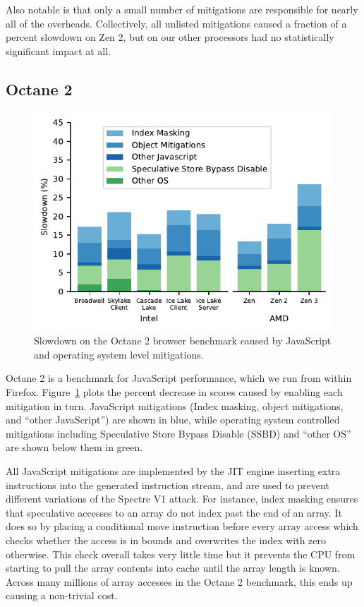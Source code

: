 Also notable is that only a small number of mitigations are responsible for nearly all of the overheads.
Collectively, all unlisted mitigations caused a fraction of a percent slowdown on Zen 2, but on our other processors had no statistically significant impact at all.

\subsection{Octane 2}
\label{sec:benchmarks:octane-2}

\begin{figure}[t]
    \includegraphics[width=\columnwidth]{plots/octane2.pdf}
    \caption{Slowdown on the Octane 2 browser benchmark caused by JavaScript and operating system level mitigations.}
    \label{fig:octane2}
\end{figure}

Octane 2 is a benchmark for JavaScript performance, which we run from within Firefox.
Figure~\ref{fig:octane2} plots the percent decrease in scores caused by enabling each mitigation in turn.
JavaScript mitigations (Index masking, object mitigations, and ``other JavaScript'') are shown in blue, while operating system controlled mitigations including Speculative Store Bypass Disable (SSBD) and ``other OS'' are shown below them in green.

All JavaScript mitigations are implemented by the JIT engine inserting extra instructions into the generated instruction stream, and are used to prevent different variations of the Spectre V1 attack.
For instance, index masking ensures that speculative accesses to an array do not index past the end of an array.
It does so by placing a conditional move instruction before every array access which checks whether the access is in bounds and overwrites the index with zero otherwise.
This check overall takes very little time but it prevents the CPU from starting to pull the array contents into cache until the array length is known.
Across many millions of array accesses in the Octane 2 benchmark, this ends up causing a non-trivial cost.

